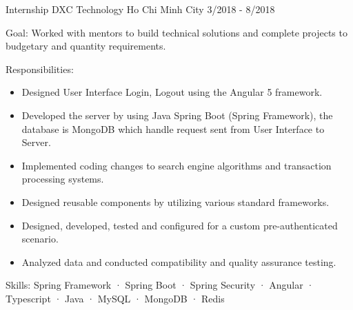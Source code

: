   \cventry
    {Internship} %
    {DXC Technology} %
    {Ho Chi Minh City} %
    {3/2018 - 8/2018} %
    {
      \begin{cvitems} %
        \item {Goal: Worked with mentors to build technical solutions and complete projects to budgetary and quantity requirements.}
        \item {Responsibilities: }
        {
            \begin{itemize} %
                \item {Designed User Interface Login, Logout using the Angular 5 framework.}
                \item {Developed the server by using Java Spring Boot (Spring Framework), the database is MongoDB which handle request sent from User Interface to Server.}
                \item {Implemented coding changes to search engine algorithms and transaction processing systems.}
                \item {Designed reusable components by utilizing various standard frameworks.}
                \item {Designed, developed, tested and configured for a custom pre-authenticated scenario.}
                \item {Analyzed data and conducted compatibility and quality assurance testing.}
            \end{itemize}
        }
        \item {Skills: Spring Framework · Spring Boot · Spring Security · Angular · Typescript · Java · MySQL · MongoDB · Redis}
      \end{cvitems}
    }
